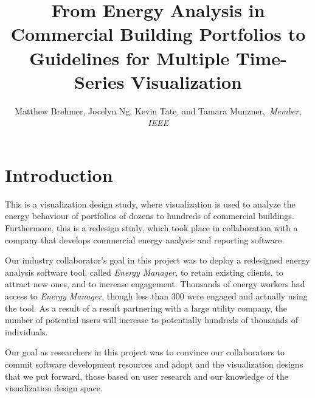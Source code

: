 \documentclass[journal]{vgtc}                %
\title{From Energy Analysis in Commercial Building Portfolios to Guidelines for Multiple Time-Series Visualization}
\author{Matthew Brehmer, Jocelyn Ng, Kevin Tate, and Tamara Munzner,~\textit{Member, IEEE}}
\begin{document}

\maketitle



\section{Introduction}
\label{introduction}


This is a visualization design study, where visualization is used to analyze the energy behaviour of portfolios of dozens to hundreds of commercial buildings. 
Furthermore, this is a redesign study, which took place in collaboration with a company that develops commercial energy analysis and reporting software.

Our industry collaborator's goal in this project was to deploy a redesigned energy analysis software tool, called {\it Energy Manager}, to retain existing clients, to attract new ones, and to increase engagement. 
Thousands of energy workers had access to {\it Energy Manager}, though less than 300 were engaged and actually using the tool. 
As a result of a result partnering with a large utility company, the number of potential users will increase to potentially hundreds of thousands of individuals.

Our goal as researchers in this project was to convince our collaborators to commit software development resources and adopt and the visualization designs that we put forward, those based on user research and our knowledge of the visualization design space.
\end{document}
